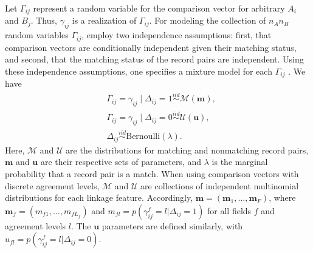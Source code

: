 \documentclass[ba]{imsart}
\begin{document}
Let $\Gamma_{ij}$ represent a random variable for the comparison vector for arbitrary $A_i$ and $B_j$.  Thus, $\gamma_{ij}$ is a realization of $\Gamma_{ij}$.  For modeling the collection of $n_An_B$ random variables $\Gamma_{ij}$, \cite{fellegi_theory_1969} employ two independence assumptions: first, that comparison vectors are conditionally independent given their matching status, and second, that the matching status of the record pairs are independent. Using these independence assumptions,  one specifies a mixture model for each $\Gamma_{ij}$ \citep[e.g., as in ][]{winkler_state_1999,jaro1989,larsen_2001,enamorado2019using}.  We have
\begin{subequations}
\begin{align}
&\Gamma_{ij} = \gamma_{ij} \mid \Delta_{ij} = 1 \stackrel{iid}{\sim} \mathcal{M}(\bm{m}), \label{eqn:fs_model} \\
&\Gamma_{ij} = \gamma_{ij} \mid \Delta_{ij} = 0  \stackrel{iid}{\sim} \mathcal{U}(\bm{u}), \label{eqn:m_dist}\\
&\Delta_{ij}   \stackrel{iid}{\sim} \text{Bernoulli}(\lambda). \label{eqn:lambda_dist}
\end{align}
\end{subequations}
Here, $\mathcal{M}$ and $\mathcal{U}$ are the distributions for matching and nonmatching record pairs, $\bm{m}$ and $\bm{u}$ are their respective sets of parameters, and $\lambda$ is the marginal probability that a record pair is a match. When using comparison vectors with discrete agreement levels, $\mathcal{M}$ and $\mathcal{U}$ are collections of independent multinomial distributions for each linkage feature. Accordingly, $\bm{m} = (\bm{m}_1, \ldots, \bm{m}_F)$, where $\bm{m}_f = (m_{f1}, \ldots, m_{fL_f})$ and $m_{fl} = p(\gamma_{ij}^f = l|\Delta_{ij} = 1)$ for all fields $f$ and agreement levels $l$. The $\bm{u}$ parameters are defined similarly, with $u_{fl} = p(\gamma_{ij}^f = l|\Delta_{ij} = 0)$.

\end{document}
